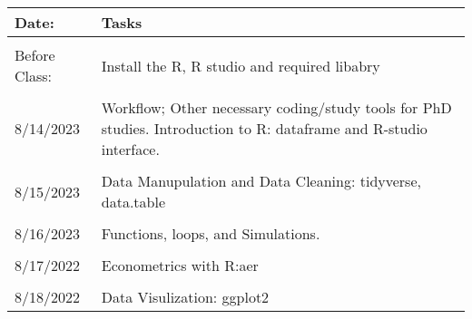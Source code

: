 \documentclass{article}
\begin{document}
\begin{tabularx}{\textwidth}{l|X}
\toprule
Date: & Tasks \\\midrule\\
Before Class: & Install the R, R studio and required libabry\\\\
8/14/2023     &      Workflow; Other necessary coding/study tools for PhD studies. Introduction to R: dataframe and R-studio interface. \\\\
8/15/2023                & Data Manupulation and Data Cleaning: tidyverse, data.table\\\\
8/16/2023          & Functions, loops, and Simulations. \\\\
8/17/2022               &   Econometrics with R:aer \\\\
8/18/2022               & Data Visulization: ggplot2\\
\bottomrule
\end{tabularx}
\end{document}
